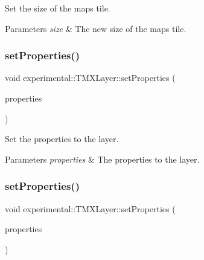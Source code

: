 Set the size of the map\textquotesingle{}s tile.


\begin{DoxyParams}{Parameters}
{\em size} & The new size of the map\textquotesingle{}s tile. \\
\hline
\end{DoxyParams}
\mbox{\label{classexperimental_1_1TMXLayer_ad1a39654c70a971538a195ec861cb3f5}} 
\subsubsection{\texorpdfstring{set\+Properties()}{setProperties()}\hspace{0.1cm}{\footnotesize\ttfamily [1/2]}}
{\footnotesize\ttfamily void experimental\+::\+T\+M\+X\+Layer\+::set\+Properties (\begin{DoxyParamCaption}\item[{const Value\+Map \&}]{properties }\end{DoxyParamCaption})\hspace{0.3cm}{\ttfamily [inline]}}

Set the properties to the layer.


\begin{DoxyParams}{Parameters}
{\em properties} & The properties to the layer. \\
\hline
\end{DoxyParams}
\mbox{\label{classexperimental_1_1TMXLayer_ad1a39654c70a971538a195ec861cb3f5}} 
\subsubsection{\texorpdfstring{set\+Properties()}{setProperties()}\hspace{0.1cm}{\footnotesize\ttfamily [2/2]}}
{\footnotesize\ttfamily void experimental\+::\+T\+M\+X\+Layer\+::set\+Properties (\begin{DoxyParamCaption}\item[{const Value\+Map \&}]{properties }\end{DoxyParamCaption})\hspace{0.3cm}{\ttfamily [inline]}}

